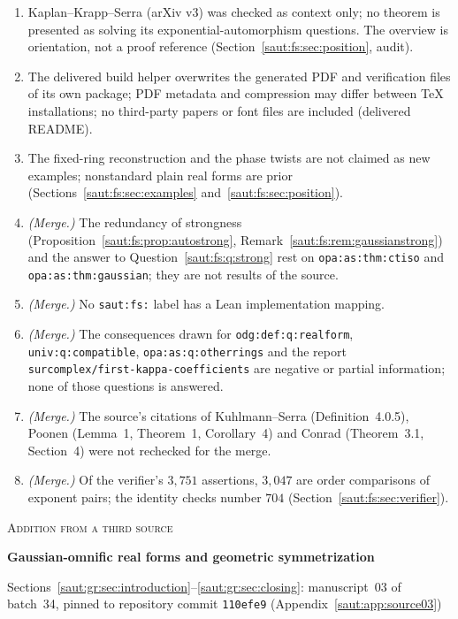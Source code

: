 \documentclass[11pt]{article}
\theoremstyle{definition}
\theoremstyle{remark}
\newcommand{\repo}[1]{\nolinkurl{#1}}%
\newcommand{\lbl}[1]{\nolinkurl{#1}}%
\numberwithin{equation}{section}
\begin{document}
\begin{enumerate}[label=\arabic*.,leftmargin=2.2em]
(Section~\ref{saut:fs:sec:questions}).
\item Kaplan--Krapp--Serra (arXiv v3) was checked as context only; no theorem is
presented as solving its exponential-automorphism questions. The overview
\cite{Wiki} is orientation, not a proof reference (Section~\ref{saut:fs:sec:position},
audit).
\item The delivered build helper overwrites the generated PDF and verification files
of its own package; PDF metadata and compression may differ between TeX installations;
no third-party papers or font files are included (delivered README).
\item The fixed-ring reconstruction and the phase twists are not claimed as new
examples; nonstandard plain real forms are prior (Sections~\ref{saut:fs:sec:examples}
and~\ref{saut:fs:sec:position}).
\item \emph{(Merge.)} The redundancy of strongness
(Proposition~\ref{saut:fs:prop:autostrong}, Remark~\ref{saut:fs:rem:gaussianstrong})
and the answer to Question~\ref{saut:fs:q:strong} rest on \lbl{opa:as:thm:ctiso} and
\lbl{opa:as:thm:gaussian}; they are not results of the source.
\item \emph{(Merge.)} No \texttt{saut:fs:} label has a Lean implementation mapping.
\item \emph{(Merge.)} The consequences drawn for \lbl{odg:def:q:realform},
\lbl{univ:q:compatible}, \lbl{opa:as:q:otherrings} and the report
\repo{surcomplex/first-kappa-coefficients} are negative or partial information; none of
those questions is answered.
\item \emph{(Merge.)} The source's citations of Kuhlmann--Serra (Definition~4.0.5),
Poonen (Lemma~1, Theorem~1, Corollary~4) and Conrad (Theorem~3.1, Section~4) were not
rechecked for the merge.
\item \emph{(Merge.)} Of the verifier's $3{,}751$ assertions, $3{,}047$ are order
comparisons of exponent pairs; the identity checks number $704$
(Section~\ref{saut:fs:sec:verifier}).
\end{enumerate}

\clearpage
{}
{}
\begin{center}
{\large\scshape Addition from a third source\par}
\vspace{0.3em}
{\Large\bfseries\color{ink} Gaussian-omnific real forms and geometric symmetrization\par}
\vspace{0.3em}
{\small Sections~\ref{saut:gr:sec:introduction}--\ref{saut:gr:sec:closing}:
manuscript~03 of batch~34, pinned to repository commit \texttt{110efe9}
(Appendix~\ref{saut:app:source03})\par}
\end{center}
\end{document}

